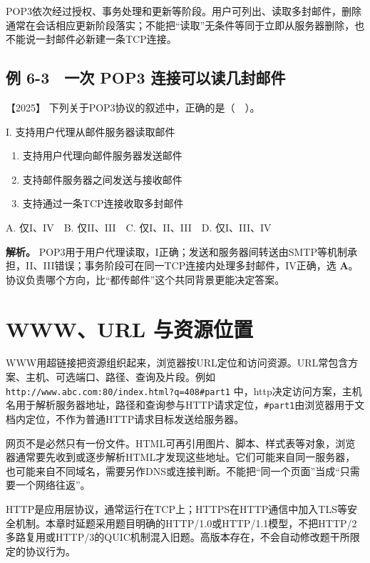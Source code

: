 POP3依次经过授权、事务处理和更新等阶段。用户可列出、读取多封邮件，删除通常在会话相应更新阶段落实；不能把``读取''无条件等同于立即从服务器删除，也不能说一封邮件必新建一条TCP连接。

\subsection{例 6-3　一次 POP3 连接可以读几封邮件}\label{cn-ex6-3}

\noindent{}【2025】 下列关于POP3协议的叙述中，正确的是（　）。

I. 支持用户代理从邮件服务器读取邮件

\begin{enumerate}
\def\labelenumi{\Roman{enumi}.}
\setcounter{enumi}{1}
\item
  支持用户代理向邮件服务器发送邮件
\item
  支持邮件服务器之间发送与接收邮件
\item
  支持通过一条TCP连接收取多封邮件
\end{enumerate}

A. 仅I、IV　B. 仅II、III　C. 仅I、II、III　D. 仅I、III、IV


\textbf{解析。} POP3用于用户代理读取，I正确；发送和服务器间转送由SMTP等机制承担，II、III错误；事务阶段可在同一TCP连接内处理多封邮件，IV正确，选 \textbf{A}。协议负责哪个方向，比``都传邮件''这个共同背景更能决定答案。

\section{WWW、URL 与资源位置}\label{cn-06-07}

WWW用超链接把资源组织起来，浏览器按URL定位和访问资源。URL常包含方案、主机、可选端口、路径、查询及片段。例如 \allowbreak{}\texttt{http://www.abc.com:80/index.html?q=408\#part1} 中，http决定访问方案，主机名用于解析服务器地址，路径和查询参与HTTP请求定位，\allowbreak{}\texttt{\#part1}由浏览器用于文档内定位，不作为普通HTTP请求目标发送给服务器。

网页不是必然只有一份文件。HTML可再引用图片、脚本、样式表等对象，浏览器通常要先收到或逐步解析HTML才发现这些地址。它们可能来自同一服务器，也可能来自不同域名，需要另作DNS或连接判断。不能把``同一个页面''当成``只需要一个网络往返''。

HTTP是应用层协议，通常运行在TCP上；HTTPS在HTTP通信中加入TLS等安全机制。本章时延题采用题目明确的HTTP/1.0或HTTP/1.1模型，不把HTTP/2多路复用或HTTP/3的QUIC机制混入旧题。高版本存在，不会自动修改题干所限定的协议行为。

